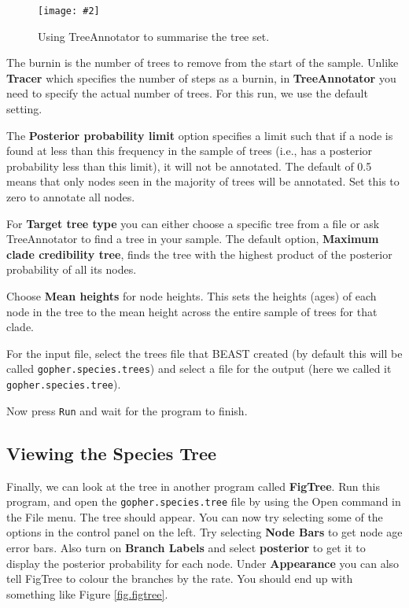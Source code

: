 \documentclass{article}
\newcommand{\includeimage}[2][]{%
\texttt{[image: \#2]}
}
\begin{document}
\begin{figure}
\centering
\includeimage[width=0.8\textwidth]{figures/TreeAnnotator}

\caption{\label{fig.TreeAnnotator} Using TreeAnnotator to summarise the tree set.}
\end{figure}


The burnin is the number of trees to remove from the start of the sample. Unlike {\bf Tracer} which specifies the number of steps as a burnin, in {\bf TreeAnnotator} you need to specify the actual number of trees. For this run, we use the default setting.

The {\bf Posterior probability limit} option specifies a limit such that if a node is found at less than this frequency in the sample of trees (i.e., has a posterior probability less than this limit), it will not be annotated. The default of 0.5 means that only nodes seen in the majority of trees will be annotated. Set this to zero to annotate all nodes.

For {\bf Target tree type} you can either choose a specific tree from a file or ask TreeAnnotator to find a tree in your sample. The default option, {\bf Maximum clade credibility tree}, finds the tree with the highest product of the posterior probability of all its nodes.

Choose {\bf Mean heights} for node heights. This sets the heights (ages) of each node in the tree to the mean height across the entire sample of trees for that clade.

For the input file, select the trees file that BEAST created (by default this will be called \texttt{gopher.species.trees}) and select a file for the output (here we called it \texttt{gopher.species.tree}).

Now press \texttt{Run} and wait for the program to finish.

\subsection*{Viewing the Species Tree}

Finally, we can look at the tree in another program called {\bf FigTree}. Run this program, and open
the \texttt{gopher.species.tree} file by using the Open command in the File menu. The tree should appear.
You can now try selecting some of the options in the control panel on the left. Try selecting
{\bf Node Bars} to get node age error bars. Also turn on {\bf Branch Labels} and select {\bf posterior} to get
it to display the posterior probability for each node. Under {\bf Appearance} you can also tell FigTree
to colour the branches by the rate.
You should end up with something like Figure \ref{fig.figtree}.
\end{document}
